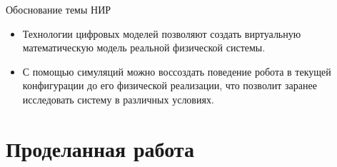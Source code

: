 \documentclass[12pt, aspectratio=169]{beamer}
\begin{document}


    \title[\docname]{\docname}
    \author[\tutorname]{\small Выполнил: ст. гр. \group \ \studentname\\[1mm]{\small Руководитель: \tutorname\\[-30mm]}}
    \date[\date]{\the\year\\[17mm]{ \city\\[-25mm]}}
    \frame{\titlepage}

    \begin{frame}{Обоснование темы НИР}\relax
      \vspace{-1.5cm}
      \begin{flushleft}
        \begin{itemize}
          \item Технологии цифровых моделей позволяют создать виртуальную математическую модель реальной физической системы.
          \item С помощью симуляций можно воссоздать поведение робота в текущей конфигурации до его физической реализации, что 
        позволит заранее исследовать систему в различных условиях. 
        \end{itemize}
      \end{flushleft}
    \end{frame}

    \section{Проделанная работа}
\end{document}
